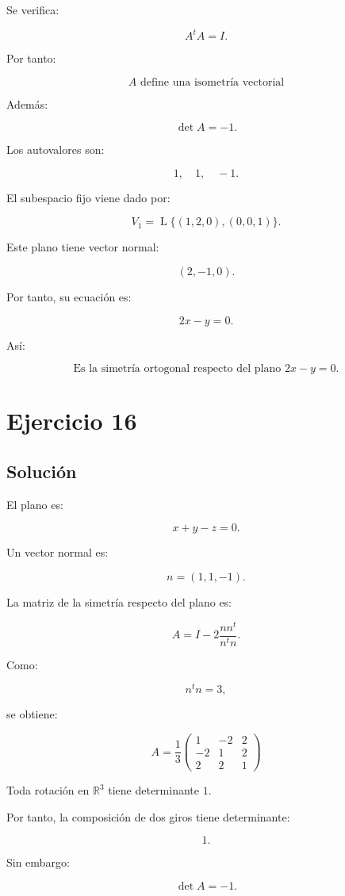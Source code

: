 \documentclass[11pt,a4paper]{article}
\newcommand{\R}{\mathbb{R}}
\newcommand{\Span}{\operatorname{L}}
\begin{document}
Se verifica:

\[
A^tA=I.
\]

Por tanto:

\[
\boxed{
A\text{ define una isometría vectorial}
}
\]

Además:

\[
\det A=-1.
\]

Los autovalores son:

\[
1,\quad1,\quad-1.
\]

El subespacio fijo viene dado por:

\[
V_1
=
\Span\{(1,2,0),(0,0,1)\}.
\]

Este plano tiene vector normal:

\[
(2,-1,0).
\]

Por tanto, su ecuación es:

\[
2x-y=0.
\]

Así:

\[
\boxed{
\text{Es la simetría ortogonal respecto del plano }2x-y=0.
}
\]

\section{Ejercicio 16}
\subsection{Solución}

El plano es:

\[
x+y-z=0.
\]

Un vector normal es:

\[
n=(1,1,-1).
\]

La matriz de la simetría respecto del plano es:

\[
A
=
I
-
2\frac{nn^t}{n^tn}.
\]

Como:

\[
n^tn=3,
\]

se obtiene:

\[
\boxed{
A
=
\frac13
\begin{pmatrix}
1&-2&2\\
-2&1&2\\
2&2&1
\end{pmatrix}
}
\]

Toda rotación en \(\R^3\) tiene determinante \(1\).

Por tanto, la composición de dos giros tiene determinante:

\[
1.
\]

Sin embargo:

\[
\det A=-1.
\]
\end{document}
